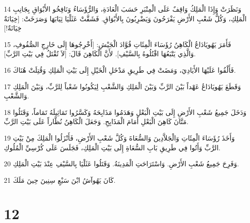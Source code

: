 \par 14 وَنَظَرَتْ وَإِذَا الْمَلِكُ وَاقِفٌ عَلَى الْمِنْبَرِ حَسَبَ الْعَادَةِ، وَالرُّؤَسَاءُ وَنَافِخُو الأَبْوَاقِ بِجَانِبِ الْمَلِكِ، وَكُلُّ شَعْبِ الأَرْضِ يَفْرَحُونَ وَيَضْرِبُونَ بِالأَبْوَاقِ. فَشَقَّتْ عَثَلْيَا ثِيَابَهَا وَصَرَخَتْ: [خِيَانَةٌ خِيَانَةٌ!]
\par 15 فَأَمَرَ يَهُويَادَاعُ الْكَاهِنُ رُؤَسَاءَ الْمِئَاتِ قُوَّادَ الْجَيْشِ: [أَخْرِجُوهَا إِلَى خَارِجِ الصُّفُوفِ، وَالَّذِي يَتْبَعُهَا اقْتُلُوهُ بِالسَّيْفِ]. لأَنَّ الْكَاهِنَ قَالَ: [لاَ تُقْتَلُ فِي بَيْتِ الرَّبِّ].
\par 16 فَأَلْقُوا عَلَيْهَا الأَيَادِيَ، وَمَضَتْ فِي طَرِيقِ مَدْخَلِ الْخَيْلِ إِلَى بَيْتِ الْمَلِكِ وَقُتِلَتْ هُنَاكَ.
\par 17 وَقَطَعَ يَهُويَادَاعُ عَهْداً بَيْنَ الرَّبِّ وَبَيْنَ الْمَلِكِ وَالشَّعْبِ لِيَكُونُوا شَعْباً لِلرَّبِّ، وَبَيْنَ الْمَلِكِ وَالشَّعْبِ.
\par 18 وَدَخَلَ جَمِيعُ شَعْبِ الأَرْضِ إِلَى بَيْتِ الْبَعْلِ وَهَدَمُوا مَذَابِحَهُ وَكَسَّرُوا تَمَاثِيلَهُ تَمَاماً، وَقَتَلُوا مَتَّانَ كَاهِنَ الْبَعْلِ أَمَامَ الْمَذَابِحِ. وَجَعَلَ الْكَاهِنُ نُظَّاراً عَلَى بَيْتِ الرَّبِّ.
\par 19 وَأَخَذَ رُؤَسَاءَ الْمِئَاتِ وَالْجَلاَّدِينَ وَالسُّعَاةَ وَكُلَّ شَعْبِ الأَرْضِ، فَأَنْزَلُوا الْمَلِكَ مِنْ بَيْتِ الرَّبِّ وَأَتُوا فِي طَرِيقِ بَابِ السُّعَاةِ إِلَى بَيْتِ الْمَلِكِ، فَجَلَسَ عَلَى كُرْسِيِّ الْمُلُوكِ.
\par 20 وَفَرِحَ جَمِيعُ شَعْبِ الأَرْضِ. وَاسْتَرَاحَتِ الْمَدِينَةُ. وَقَتَلُوا عَثَلْيَا بِالسَّيْفِ عِنْدَ بَيْتِ الْمَلِكِ.
\par 21 كَانَ يَهُوآشُ ابْنَ سَبْعِ سِنِينَ حِينَ مَلَكَ.

\chapter{12}

